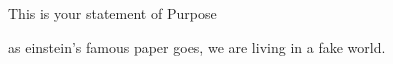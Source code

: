 \documentclass{article}
\begin{document}
This is your statement of Purpose

as \cite{einstein1935can} einstein's famous paper goes, we are living in a fake world.


\medskip



\end{document}

